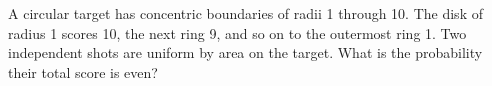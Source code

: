 A circular target has concentric boundaries of radii 1 through 10. The disk of radius 1 scores 10, the next ring 9, and so on to the outermost ring 1. Two independent shots are uniform by area on the target. What is the probability their total score is even?
